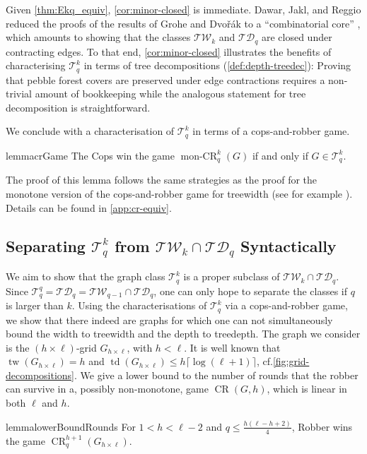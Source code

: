 \documentclass[10pt,a4paper]{article}
\newcommand{\TW}{\ensuremath{\mathcal{TW}}}
\newcommand{\TD}{\ensuremath{\mathcal{TD}}}
\newcommand{\Ekq}{\ensuremath{\mathcal{T}_{q}^{k}}}
\newcommand{\EParam}[2]{\ensuremath{\mathcal{T}_{#2}^{#1}}}
\DeclareMathOperator{\CR}{CR}
\DeclareMathOperator{\monCR}{mon-CR}
\DeclareMathOperator{\tw}{tw}
\DeclareMathOperator{\td}{td}
\newcommand{\grid}[2]{\ensuremath{G_{#1 \times #2}}}
\begin{document}
Given \cref{thm:Ekq_equiv}, \cref{cor:minor-closed} is immediate.
Dawar, Jakl, and Reggio reduced the proofs of the results of Grohe and Dvo\v{r}\'ak \cite{grohe_counting_2020,dvorak_recognizing_2010} to a ``combinatorial core'' \cite[Remark~17]{dawar_lovasz-type_2021}, which amounts to showing that the classes $\mathcal{TW}_k$ and $\mathcal{TD}_q$ are closed under contracting edges.
To that end, \cref{cor:minor-closed} illustrates the benefits of characterising $\Ekq$ in terms of tree decompositions (\cref{def:depth-treedec}): Proving that pebble forest covers are preserved under edge contractions requires a non-trivial amount of bookkeeping while the analogous statement for tree decomposition is straightforward.



We conclude with a characterisation of $\Ekq$ in terms of a cops-and-robber game.

\begin{restatable}{lemma}{crGame}
	\label{lem:Ekq-cops}
	The Cops win the game $\monCR_q^{k}(G)$ if and only if $G\in \Ekq$.
\end{restatable}

The proof of this lemma follows the same strategies as the proof for the monotone version of the cops-and-robber game for treewidth (see for example \cite{Rabinovich14}). Details can be found in \cref{app:cr-equiv}.

\subsection{Separating $\Ekq$ from $\mathcal{TW}_k \cap \mathcal{TD}_q$ Syntactically}

We aim to show that the graph class $\Ekq$ is a proper subclass of $\mathcal{TW}_k \cap \mathcal{TD}_q$.
Since $\EParam{q}{q}=\TD_q=\TW_{q-1}\cap\TD_q$, one can only hope to separate the classes if $q$ is larger than $k$.
Using the characterisations of $\Ekq$ via a cops-and-robber game, we show that there indeed are graphs for which one can not simultaneously bound the width to treewidth and the depth to treedepth.
The graph we consider is the $(h\times\ell)$-grid \grid{h}{\ell}, with $h<\ell$. It is well known that $\tw(\grid{h}{\ell})=h$ and $\td(\grid{h}{\ell})\leq h \lceil\log(\ell+1)\rceil$, cf.\@ \cref{fig:grid-decompositions}. We give a lower bound to the number of rounds that the robber can survive in a, possibly non-monotone, game $\CR(G,h)$, which is linear in both $\ell$ and $h$.

\begin{restatable}{lemma}{lowerBoundRounds}
	\label{lem:lower-bound-rounds}
	For $1<h<\ell-2$ and $q\leq\frac{h(\ell  - h + 2)}{4}$, Robber wins the game $\CR_q^{h+1}(\grid{h}{\ell})$.
\end{restatable}
\end{document}
